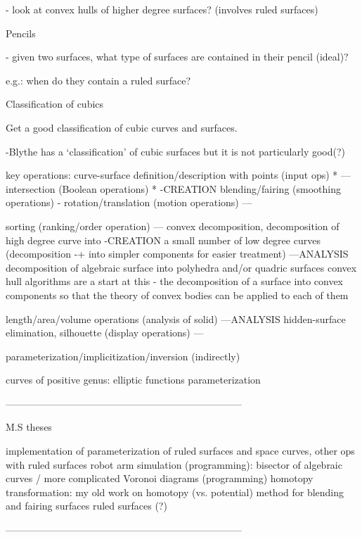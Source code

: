 	- look at convex hulls of higher degree surfaces?
		(involves ruled surfaces)


Pencils
	
	- given two surfaces, what type of surfaces are
	  contained in their pencil (ideal)?

		e.g.: when do they contain a ruled surface?


Classification of cubics

	Get a good classification of cubic curves and surfaces.

		-Blythe has a `classification' of cubic surfaces
		 but it is not particularly good(?)


key operations: curve-surface definition/description with points (input ops) *   ---
		intersection (Boolean operations)			     *	   -CREATION
		blending/fairing (smoothing operations)				   -
		rotation/translation (motion operations)		         ---

		sorting (ranking/order operation)			      ---
		convex decomposition, decomposition of high degree curve into	-CREATION
			a small number of low degree curves (decomposition 	-+ 
			into simpler components for easier treatment)	      ---ANALYSIS
			decomposition of algebraic surface into polyhedra
			and/or quadric surfaces
			convex hull algorithms are a start at this
			- the decomposition of a surface into 
			  convex components so that the theory of convex
			  bodies can be applied to each of them

		length/area/volume operations (analysis of solid)	      ---ANALYSIS
		hidden-surface elimination, silhouette (display operations)   ---

		parameterization/implicitization/inversion (indirectly)

curves of positive genus: elliptic functions          parameterization

------------------------------------------------------------------------

M.S theses

implementation of parameterization of ruled surfaces and space curves, other ops with 
	ruled surfaces
robot arm simulation (programming): 
bisector of algebraic curves / more complicated Voronoi diagrams (programming)
homotopy transformation: 
	my old work on homotopy (vs. potential) method for blending and fairing surfaces
	ruled surfaces (?)

------------------------------------------------------------------------


